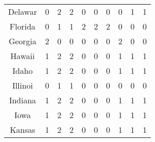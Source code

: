 \begin{longtable}{cp{1.5cm}p{1.5cm}p{1.5cm}p{1.5cm}p{1.5cm}p{1.5cm}p{1.5cm}p{1.5cm}p{1.5cm}}
Delawar &                          0 &                             2 &                          2 &                        0 &                           0 &                        0 &                         0 &                            1 &                         1 \\
Florida &                          0 &                             1 &                          1 &                        2 &                           2 &                        2 &                         0 &                            0 &                         0 \\
Georgia &                          2 &                             0 &                          0 &                        0 &                           0 &                        0 &                         2 &                            0 &                         0 \\
Hawaii  &                          1 &                             2 &                          2 &                        0 &                           0 &                        0 &                         1 &                            1 &                         1 \\
Idaho   &                          1 &                             2 &                          2 &                        0 &                           0 &                        0 &                         1 &                            1 &                         1 \\
Illinoi &                          0 &                             1 &                          1 &                        0 &                           0 &                        0 &                         0 &                            0 &                         0 \\
Indiana &                          1 &                             2 &                          2 &                        0 &                           0 &                        0 &                         1 &                            1 &                         1 \\
Iowa    &                          1 &                             2 &                          2 &                        0 &                           0 &                        0 &                         1 &                            1 &                         1 \\
Kansas  &                          1 &                             2 &                          2 &                        0 &                           0 &                        0 &                         1 &                            1 &                         1 \\

\end{longtable}
